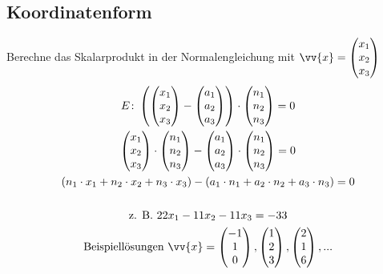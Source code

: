 \subsection{Koordinatenform}
Berechne das Skalarprodukt in der Normalengleichung mit $\vv{x} = \begin{pmatrix}x_1 \\ x_2 \\ x_3\end{pmatrix}$
\begin{gather*}
  E \colon \left(\begin{pmatrix}x_1 \\ x_2 \\ x_3\end{pmatrix} - \begin{pmatrix}a_1 \\ a_2 \\ a_3\end{pmatrix}\right) \cdot \begin{pmatrix}n_1 \\ n_2 \\ n_3\end{pmatrix} = 0 \\
  \begin{pmatrix}x_1 \\ x_2 \\ x_3\end{pmatrix} \cdot \begin{pmatrix}n_1 \\ n_2 \\ n_3\end{pmatrix} - \begin{pmatrix}a_1 \\ a_2 \\ a_3\end{pmatrix} \cdot \begin{pmatrix}n_1 \\ n_2 \\ n_3\end{pmatrix} = 0 \\
  (n_1 \cdot x_1 + n_2 \cdot x_2 + n_3 \cdot x_3) - (a_1 \cdot n_1 + a_2 \cdot n_2 + a_3 \cdot n_3) = 0 \\\\
  \text{z. B. } 22x_1 - 11x_2 - 11x_3 = -33 \\
  \text{Beispiellösungen } \vv{x} = \begin{pmatrix}-1 \\ 1 \\ 0\end{pmatrix}, \begin{pmatrix}1 \\ 2 \\ 3\end{pmatrix}, \begin{pmatrix}2 \\ 1 \\ 6\end{pmatrix}, ...
\end{gather*}
